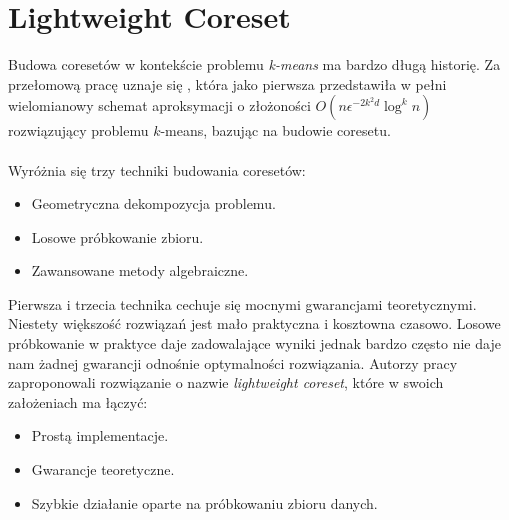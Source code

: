 \chapter{Lightweight Coreset}

Budowa coresetów w kontekście problemu \textit{k-means} ma bardzo długą historię.
Za przełomową pracę uznaje się \cite{Matousek99onapproximate}, która jako 
pierwsza przedstawiła w pełni wielomianowy schemat aproksymacji o złożoności $O(n\epsilon^{-2k^2d}\log^kn)$ rozwiązujący problemu $k$-means, bazując na budowie coresetu.
\\~\\
Wyróżnia się trzy techniki budowania coresetów:
\begin{itemize}
    \item Geometryczna dekompozycja problemu.
    \item Losowe próbkowanie zbioru.
    \item Zawansowane metody algebraiczne.
\end{itemize}
Pierwsza i trzecia technika cechuje się mocnymi gwarancjami teoretycznymi.
Niestety większość rozwiązań jest mało praktyczna i kosztowna czasowo.
Losowe próbkowanie w praktyce daje zadowalające wyniki jednak bardzo często nie daje nam żadnej gwarancji odnośnie optymalności rozwiązania.
Autorzy pracy \cite{bachem2017scalable} zaproponowali rozwiązanie o nazwie \textit{lightweight coreset}, które w swoich założeniach ma łączyć:
\begin{itemize}
    \item Prostą implementacje.
    \item Gwarancje teoretyczne.
    \item Szybkie działanie oparte na próbkowaniu zbioru danych.
\end{itemize}



